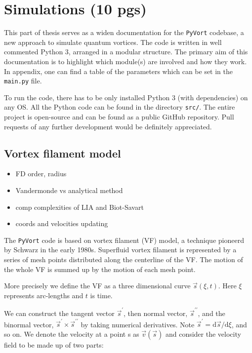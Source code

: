 \chapter{Simulations (10 pgs)}

This part of thesis serves as a widen documentation for the \texttt{PyVort} codebase, a new approach to simulate quantum vortices. The code is written in well commented Python 3, arranged in a modular structure. The primary aim of this documentation is to highlight which module(s) are involved and how they work.
In appendix, one can find a table of the parameters which can be set in the \texttt{main.py} file.

To run the code, there has to be only installed Python 3 (with dependencies) on any OS. All the Python code can be found in the directory \texttt{src/}. The entire project is open-source and can be found as a public GitHub repository. Pull requests of any further development would be definitely appreciated.



\section{Vortex filament model}
\begin{itemize}
	\item FD order, radius
	\item Vandermonde vs analytical method
	\item comp complexities of LIA and Biot-Savart
	\item coords and velocities updating
\end{itemize}

The \texttt{PyVort} code is based on vortex filament (VF) model, a technique pioneerd by Schwarz in the early 1980s. Superfluid vortex filament is represented by a series of mesh points distributed along the centerline of the VF. The motion of the whole VF is summed up by the motion of each mesh point.

More precisely we define the VF as a three dimensional curve
$\vec{s}(\xi, t)$. Here $\xi$ represents arc-lengths and $t$ is time.



We can construct the tangent vector $\vec{s}^{\prime}$, then normal vector, $\vec{s}^{\prime\prime}$, and the binormal vector, $\vec{s}^{\prime} \times \vec{s}^{\prime\prime}$ by taking numerical derivatives. Note $\vec{s}^{\prime} = \text{d}\vec{s} / \text{d}\xi$,
and so on. We denote the velocity at a point s as $\vec{v}(\vec{s})$ and consider the velocity field to be made up of two parts:

